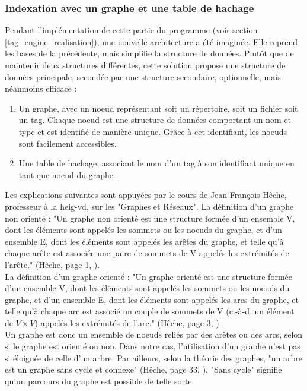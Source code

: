 \documentclass[a4paper, 12pt]{article}
\begin{document}
\subsubsection{Indexation avec un graphe et une table de hachage}\label{graphe_architecture}
Pendant l'implémentation de cette partie du programme (voir section \ref{tag_engine_realisation}), 
une nouvelle architecture a été imaginée. Elle reprend les bases de la précédente, mais simplifie 
la structure de données. Plutôt que de maintenir deux structures différentes, cette solution 
propose une structure de données principale, secondée par une structure secondaire, optionnelle, 
mais néanmoins efficace :
\begin{enumerate}
    \item Un graphe, avec un noeud représentant soit un répertoire, soit un fichier 
        soit un tag. Chaque noeud est une structure de données comportant un nom et type et est 
        identifié de manière unique. Grâce à cet identifiant, les noeuds sont facilement accessibles.
    \item Une table de hachage, associant le nom d'un tag à son identifiant unique en tant que 
        noeud du graphe.
\end{enumerate}
Les explications suivantes sont appuyées par le cours de Jean-François Hêche, professeur à la 
heig-vd, sur les "Graphes et Réseaux". La définition d'un graphe non orienté : "Un graphe non 
orienté est une structure formée d'un ensemble V, dont les éléments sont appelés les sommets 
ou les noeuds du graphe, et d'un ensemble E, dont les éléments sont appelés les arêtes du graphe, 
et telle qu'à chaque arête est associée une paire de sommets de V appelés les extrémités de 
l'arête." (Hêche, page 1, \cite{ref28}).
\\
La définition d'un graphe orienté : "Un graphe orienté est une structure formée d'un ensemble V, dont 
les éléments sont appelés les sommets ou les noeuds du graphe, et d'un ensemble E, dont les éléments 
sont appelés les arcs du graphe, et telle qu'à chaque arc est associé un couple de sommets de 
V (c.-à-d. un élément de $V \times V$) appelés les extrémités de l'arc." (Hêche, page 3, \cite{ref28}). 
\\
Un graphe est donc un ensemble de noeuds reliés par des arêtes ou des arcs, selon si le graphe est 
orienté ou non. Dans notre cas, l'utilisation d'un graphe n'est pas si éloignée de celle d'un arbre. 
Par ailleurs, selon la théorie des graphes, "un arbre est un graphe sans cycle et connexe" (Hêche, 
page 33, \cite{ref28}). "Sans cycle" signifie qu'un parcours du graphe est possible de telle sorte 
\end{document}

